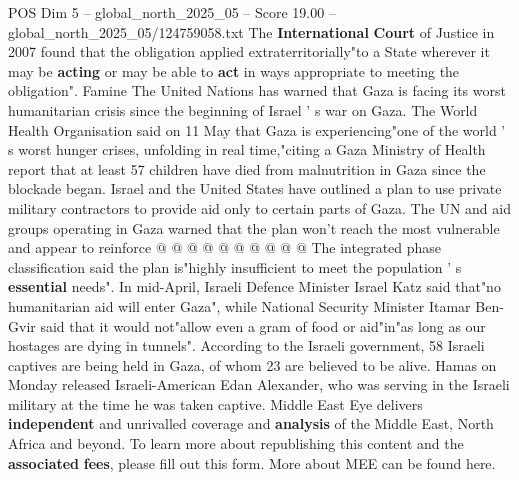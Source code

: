 \begin{textsample}{POS Dim 5 – global\_north\_2025\_05 – Score 19.00 – global\_north\_2025\_05/124759058.txt}
The \textbf{International} \textbf{Court} of Justice in 2007 found that the obligation applied extraterritorially"to a State wherever it may be \textbf{acting} or may be able to \textbf{act} in ways appropriate to meeting the obligation".
Famine The United Nations has warned that Gaza is facing its worst humanitarian crisis since the beginning of Israel ' s war on Gaza.
The World Health Organisation said on 11 May that Gaza is experiencing"one of the world ' s worst hunger crises, unfolding in real time,"citing a Gaza Ministry of Health report that at least 57 children have died from malnutrition in Gaza since the blockade began.
Israel and the United States have outlined a plan to use private military contractors to provide aid only to certain parts of Gaza.
The UN and aid groups operating in Gaza warned that the plan won't reach the most vulnerable and appear to reinforce @ @ @ @ @ @ @ @ @ @ The integrated phase classification said the plan is"highly insufficient to meet the population ' s \textbf{essential} needs".
In mid-April, Israeli Defence Minister Israel Katz said that"no humanitarian aid will enter Gaza", while National Security Minister Itamar Ben-Gvir said that it would not"allow even a gram of food or aid"in"as long as our hostages are dying in tunnels".
According to the Israeli government, 58 Israeli captives are being held in Gaza, of whom 23 are believed to be alive.
Hamas on Monday released Israeli-American Edan Alexander, who was serving in the Israeli military at the time he was taken captive.
Middle East Eye delivers \textbf{independent} and unrivalled coverage and \textbf{analysis} of the Middle East, North Africa and beyond.
To learn more about republishing this content and the \textbf{associated} \textbf{fees}, please fill out this form.
More about MEE can be found here.

\end{textsample}
